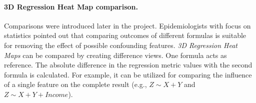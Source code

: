 \documentclass[journal]{style/vgtc} 			          %
\begin{document}
\paragraph{3D Regression Heat Map comparison.}
Comparisons were introduced later in the project.
Epidemiologists with focus on statistics pointed out that comparing outcomes of different formulas is suitable for removing the effect of possible confounding features.
\emph{3D Regression Heat Maps} can be compared by creating difference views.
One formula acts as reference.
The absolute difference in the regression metric values with the second formula is calculated. %
For example, it can be utilized for comparing the influence of a single feature on the complete result (e.g., $Z \sim X + Y$ and $Z \sim X + Y + Income$).
\end{document}
